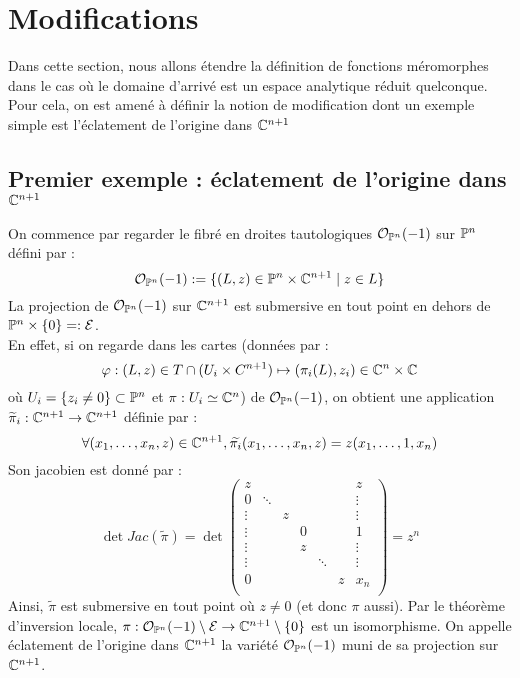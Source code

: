 \documentclass[a4page,10pt]{article}
\begin{document}

\fi
\section{Modifications}
Dans cette section, nous allons \'etendre la d\'efinition de fonctions m\'eromorphes dans le cas o\`u le domaine d'arriv\'e est un espace analytique r\'eduit quelconque. Pour cela, on est amen\'e \`a d\'efinir la notion de modification dont un exemple simple est l'\'eclatement de l'origine dans $\C^{n+1}$
\subsection{Premier exemple : \'eclatement de l'origine dans $\C^{n+1}$}
On commence par regarder le fibr\'e en droites tautologiques $ \Ocal_{\P^n}(-1)$ sur $\P^n$ d\'efini par :
\[ \Ocal_{\P^n}(-1):= \{ (L,z) \in \P^n\times \C^{n+1} \mid z \in L \}
\]
La projection de $\Ocal_{\P^n}(-1)$ sur $\C^{n+1}$ est submersive en tout point en dehors de $\P^n\times\{0\}=:\Ecal$. \\
En effet, si on regarde dans les cartes (donn\'ees par : 
	\[\varphi :(L,z) \in T \cap (U_i \times C^{n+1}) \mapsto (\pi_i(L),z_i)\in \C^n \times \C
\]
 o\`u $U_i=\{z_i \neq 0\} \subset \P^n$ et $\pi : U_i \simeq \C^n$) 
de $\Ocal_{\P^n}(-1)$, on obtient une application $\widetilde{\pi}_i : \C^{n+1} \to \C^{n+1}$ d\'efinie par :
\[  \forall (x_1,\ldots,x_n,z) \in \C^{n+1}, \widetilde{\pi_i}(x_1,\ldots,x_n,z)=z(x_1,\ldots,1,x_n)
\]
Son jacobien est donn\'e par :
\[
 \det Jac(\widetilde{\pi})=\det\begin{pmatrix}
    z&&&&&&z \\
    0&\ddots&&&&&\vdots\\
    \vdots&&z&&&&\vdots\\
    \vdots&&&0&&&1\\
    \vdots&&&z&&&\vdots\\
    \vdots&&&&\ddots&&\vdots\\
    0&&&&&z&x_n\\
    \end{pmatrix}=z^n
  \]
  Ainsi, $\widetilde{\pi}$ est submersive en tout point o\`u $z \neq 0$ (et donc $\pi$ aussi).
  Par le th\'eor\`eme d'inversion locale, $\pi : \Ocal_{\P^n}(-1)\setminus \Ecal \to \C^{n+1} \setminus \{0\}$ est un isomorphisme. On appelle \'eclatement de l'origine dans $\C^{n+1}$ la vari\'et\'e $\Ocal_{\P^n}(-1)$ muni de sa projection sur $\C^{n+1}$.
\end{document}
